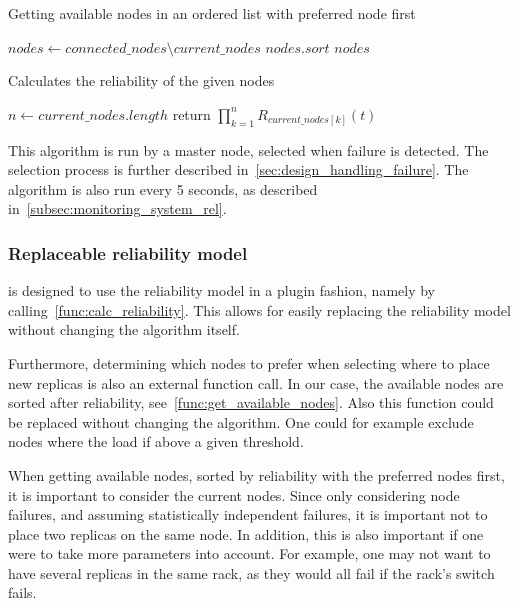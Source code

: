 \documentclass{cslthse-msc}
\begin{document}
\begin{function} 
	\caption{Getting available nodes in an ordered list with preferred node first} \label{func:get_available_nodes}
	\begin{algorithmic}[1]
	\Statex
	    \State $nodes\gets connected\_nodes \setminus current\_nodes$
	    \State $nodes.sort$
	    \State \Return $nodes$
	\EndFunction
	\end{algorithmic}
\end{function}

\begin{function} 
	\caption{Calculates the reliability of the given nodes} \label{func:calc_reliability}
	\begin{algorithmic}[1]
	\Statex
		\State $n\gets current\_nodes.length$
		\State return $ \prod\limits_{k=1}^n R_{current\_nodes[k]}(t)$
	\EndFunction
	\end{algorithmic}
\end{function}

This algorithm is run by a master node, selected when failure is detected. The selection process is further described in~\cref{sec:design_handling_failure}. The algorithm is also run every 5 seconds, as described in~\cref{subsec:monitoring_system_rel}.

\subsubsection{Replaceable reliability model}
 is designed to use the reliability model in a plugin fashion, namely by calling~\cref{func:calc_reliability}. This allows for easily replacing the reliability model without changing the algorithm itself.

Furthermore, determining which nodes to prefer when selecting where to place new replicas is also an external function call. In our case, the available nodes are sorted after reliability, see~\cref{func:get_available_nodes}. Also this function could be replaced without changing the algorithm. One could for example exclude nodes where the load if above a given threshold.

When getting available nodes, sorted by reliability with the preferred nodes first, it is important to consider the current nodes. Since only considering node failures, and assuming statistically independent failures, it is important not to place two replicas on the same node. In addition, this is also important if one were to take more parameters into account. For example, one may not want to have several replicas in the same rack, as they would all fail if the rack's switch fails.
\end{document}
